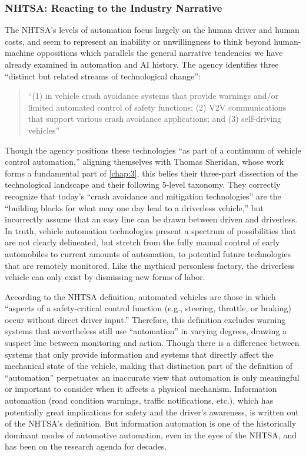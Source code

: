 \subsubsection{NHTSA: Reacting to the Industry Narrative}

The NHTSA's levels of automation focus largely on the human driver and
human costs, and seem to represent an inability or unwillingness to
think beyond human-machine oppositions which 
parallels the general narrative tendencies we have already examined in
automation and AI history. 
The agency identifies three ``distinct but related streams of
technological change'': 

\begin{quote}
``(1) in vehicle crash avoidance systems that provide warnings and/or
limited automated control of safety functions; (2) V2V communications
that support various crash avoidance applications; and (3)
self-driving vehicles''\cite[p. 3]{NHTSA}
\end{quote}

Though the agency positions these technologies ``as part of a
continuum of vehicle control automation,''\cite[p. 3]{NHTSA} aligning
themselves with Thomas Sheridan, whose
work forms a fundamental part of \ref{chap:3}, this belies
their three-part dissection of the technological landscape and their
following 5-level taxonomy. They correctly recognize that today's
``crash avoidance and mitigation technologies'' are the ``building blocks
for what may one day lead to a driverless vehicle,'' but incorrectly
assume that an easy line can be drawn between driven and
driverless.\cite[p. 3]{NHTSA} In truth, vehicle automation
technologies present a spectrum of possibilities that are not clearly
delineated, but stretch from the fully manual control of early
automobiles to current amounts of automation, to potential future
technologies that are remotely monitored. Like the mythical personless
factory, the driverless vehicle can only exist by dismissing new forms
of labor. 

According to the NHTSA definition, automated
vehicles are those in which ``aspects of a safety-critical control
function (e.g., steering, throttle, or braking) occur without direct
driver input.''\cite[p. 3]{NHTSA} Therefore, this definition excludes warning
systems that nevertheless still use ``automation'' in varying degrees,
drawing a suspect line between monitoring and action. Though there is
a difference between systems that only provide information and systems
that directly affect the mechanical state of the vehicle, making that
distinction part of the definition of ``automation'' perpetuates an
inaccurate view that automation is only meaningful or important to
consider when it affects a physical mechanism. Information automation
(road condition warnings, traffic notifications, etc.), which has
potentially great implications for safety and the driver's awareness,
is written out of the NHTSA's definition. But information automation
is one of the historically dominant modes of automotive automation,
even in the eyes of the NHTSA, and has been on the research agenda for
decades.\cite[p. 11]{wetmore}

